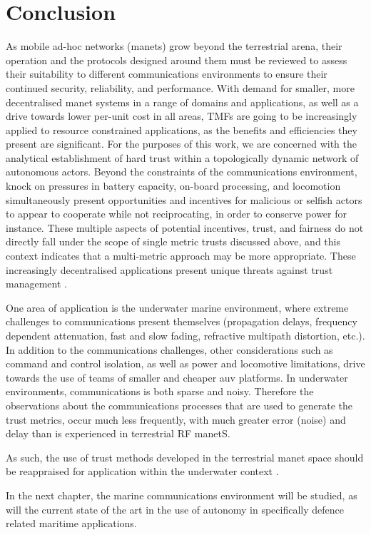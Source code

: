 \section{Conclusion}
As mobile ad-hoc networks (\gls{manet}s) grow beyond the terrestrial arena, their operation and the protocols designed around them must be reviewed to assess their suitability to different communications environments to ensure their continued security, reliability, and performance.
With demand for smaller, more decentralised \gls{manet} systems in a range of domains and applications, as well as a drive towards lower per-unit cost in all areas, TMFs are going to be increasingly applied to resource constrained applications, as the benefits and efficiencies they present are significant.
For the purposes of this work, we are concerned with the analytical establishment of hard trust within a topologically dynamic network of autonomous actors.
Beyond the constraints of the communications environment, knock on pressures in battery capacity, on-board processing, and locomotion simultaneously present opportunities and incentives for malicious or selfish actors to appear to cooperate while not reciprocating, in order to conserve power for instance.
These multiple aspects of potential incentives, trust, and fairness do not directly fall under the scope of single metric trusts discussed above, and this context indicates that a multi-metric approach may be more appropriate.
These increasingly decentralised applications present unique threats against trust management \cite{Caiti2011}.

One area of application is the underwater marine environment, where extreme challenges to communications present themselves (propagation delays, frequency dependent attenuation, fast and slow fading, refractive multipath distortion, etc.).
In addition to the communications challenges, other considerations such as command and control isolation, as well as power and locomotive limitations, drive towards the use of teams of smaller and cheaper \gls{auv} platforms.
In underwater environments, communications is both sparse and noisy.
Therefore the observations about the communications processes that are used to generate the trust metrics, occur much less frequently, with much greater error (noise) and delay than is experienced in terrestrial RF \gls{manet}S.

As such, the use of trust methods developed in the terrestrial \gls{manet} space should be reappraised for application within the underwater context \cite{Pavan2015}.

In the next chapter, the marine communications environment will be studied, as will the current state of the art in the use of autonomy in specifically defence related maritime applications.
\ifx\ifthesis\undefined

\else
\fi
